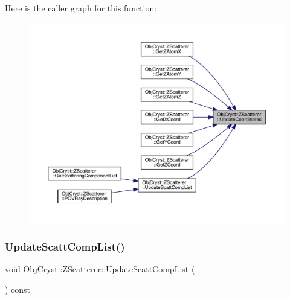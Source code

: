 Here is the caller graph for this function\+:
\nopagebreak
\begin{figure}[H]
\begin{center}
\leavevmode
\includegraphics[width=350pt]{class_obj_cryst_1_1_z_scatterer_ab6afaab6104211bbca7722033e17a128_icgraph}
\end{center}
\end{figure}
\mbox{\label{class_obj_cryst_1_1_z_scatterer_acec423f3f42ba0b1c173d8bc9fe96279}} 
\subsubsection{\texorpdfstring{UpdateScattCompList()}{UpdateScattCompList()}}
{\footnotesize\ttfamily void Obj\+Cryst\+::\+Z\+Scatterer\+::\+Update\+Scatt\+Comp\+List (\begin{DoxyParamCaption}{ }\end{DoxyParamCaption}) const\hspace{0.3cm}{\ttfamily [protected]}}

